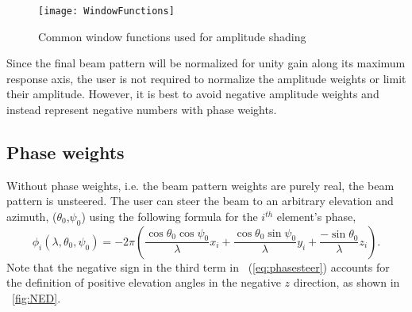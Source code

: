 \begin{figure}[!ht]
\begin{center}
\texttt{[image: WindowFunctions]}
\caption{\label{fig:WindowFunctions}Common window functions used for amplitude shading}
\end{center}
\end{figure}

Since the final beam pattern will be normalized for unity gain along its maximum response axis, the user is not required to normalize the amplitude weights or limit their amplitude. However, it is best to avoid negative amplitude weights and instead represent negative numbers with phase weights.

\subsection{Phase weights}

Without phase weights, i.e. the beam pattern weights are purely real, the beam pattern is unsteered. The user can steer the beam to an arbitrary elevation and azimuth, ($\theta_0$,$\psi_0$) using the following formula for the $i^{th}$ element's phase,
\begin{equation}
\phi_i(\lambda,\theta_0,\psi_0) = -2\pi\left(\frac{\cos\theta_0\cos\psi_0}{\lambda}x_i + \frac{\cos\theta_0\sin\psi_0}{\lambda}y_i + \frac{-\sin\theta_0}{\lambda}z_i \right).\label{eq:phasesteer}
\end{equation}
Note that the negative sign in the third term in \eqnname~(\ref{eq:phasesteer}) accounts for the definition of positive elevation angles in the negative $z$ direction, as shown in \figname~\ref{fig:NED}.